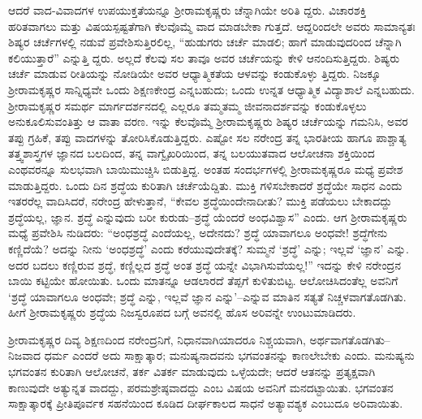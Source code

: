 ಆದರೆ ವಾದ-ವಿವಾದಗಳ ಉಪಯುಕ್ತತೆಯನ್ನೂ ಶ್ರೀರಾಮಕೃಷ್ಣರು ಚೆನ್ನಾಗಿಯೇ ಅರಿತಿ ದ್ದರು. ವಿಚಾರಶಕ್ತಿ ಹರಿತವಾಗಲು ಮತ್ತು ವಿಷಯಸ್ಪಷ್ಟತೆಗಾಗಿ ಕೆಲವೊಮ್ಮೆ ವಾದ ಮಾಡಬೇಕಾ ಗುತ್ತದೆ. ಆದ್ದರಿಂದಲೇ ಅವರು ಸಾಮಾನ್ಯತಃ ಶಿಷ್ಯರ ಚರ್ಚೆಗಳಲ್ಲಿ ನಡುವೆ ಪ್ರವೇಶಿಸುತ್ತಿರಲಿಲ್ಲ, “ಹುಡುಗರು ಚರ್ಚೆ ಮಾಡಲಿ; ಹಾಗೆ ಮಾಡುವುದರಿಂದ ಚೆನ್ನಾಗಿ ಕಲಿಯುತ್ತಾರೆ” ಎನ್ನುತ್ತಿ ದ್ದರು. ಅಲ್ಲದೆ ಕೆಲವು ಸಲ ತಾವೂ ಅವರ ಚರ್ಚೆಯನ್ನು ಕೇಳಿ ಆನಂದಿಸುತ್ತಿದ್ದರು. ಶಿಷ್ಯರು ಚರ್ಚೆ ಮಾಡುವ ರೀತಿಯನ್ನು ನೋಡಿಯೇ ಅವರ ಆಧ್ಯಾತ್ಮಿಕತೆಯ ಆಳವನ್ನು ಕಂಡುಕೊಳ್ಳು ತ್ತಿದ್ದರು. ನಿಜಕ್ಕೂ ಶ್ರೀರಾಮಕೃಷ್ಣರ ಸಾನ್ನಿಧ್ಯವೇ ಒಂದು ಶಿಕ್ಷಣಕೇಂದ್ರ ಎನ್ನಬಹುದು; ಒಂದು ಉನ್ನತ ಆಧ್ಯಾತ್ಮಿಕ ವಿದ್ಯಾಶಾಲೆ ಎನ್ನಬಹುದು. ಶ್ರೀರಾಮಕೃಷ್ಣರ ಸಮರ್ಥ ಮಾರ್ಗದರ್ಶನದಲ್ಲಿ ಎಲ್ಲರೂ ತಮ್ಮತಮ್ಮ ಜೀವನಾದರ್ಶವನ್ನು ಕಂಡುಕೊಳ್ಳಲು ಅನುಕೂಲಿಸುವಂತಿತ್ತು ಆ ವಾತಾ ವರಣ. ಇನ್ನು ಕೆಲವೊಮ್ಮೆ ಶ್ರೀರಾಮಕೃಷ್ಣರು ಶಿಷ್ಯರ ಚರ್ಚೆಯನ್ನು ಗಮನಿಸಿ, ಅವರ ತಪ್ಪು ಗ್ರಹಿಕೆ, ತಪ್ಪು ವಾದಗಳನ್ನು ತೋರಿಸಿಕೊಡುತ್ತಿದ್ದರು. ಎಷ್ಟೋ ಸಲ ನರೇಂದ್ರ ತನ್ನ ಭಾರತೀಯ ಹಾಗೂ ಪಾಶ್ಚಾತ್ಯ ತತ್ತ್ವಶಾಸ್ತ್ರಗಳ ಜ್ಞಾನದ ಬಲದಿಂದ, ತನ್ನ ವಾಗ್ವೈಖರಿಯಿಂದ, ತನ್ನ ಬಲಯುತವಾದ ಆಲೋಚನಾ ಶಕ್ತಿಯಿಂದ ಎಂಥವರನ್ನೂ ಸುಲಭವಾಗಿ ಬಾಯಿಮುಚ್ಚಿಸಿ ಬಿಡುತ್ತಿದ್ದ. ಅಂತಹ ಸಂದರ್ಭಗಳಲ್ಲಿ ಶ್ರೀರಾಮಕೃಷ್ಣರೂ ಮಧ್ಯೆ ಪ್ರವೇಶ ಮಾಡುತ್ತಿದ್ದರು. ಒಂದು ದಿನ ಶ್ರದ್ಧೆಯ ಕುರಿತಾಗಿ ಚರ್ಚೆಯೆದ್ದಿತು. ಮುಕ್ತಿ ಗಳಿಸಬೇಕಾದರೆ ಶ್ರದ್ಧೆಯೇ ಸಾಧನ ಎಂದು ಇತರರೆಲ್ಲ ವಾದಿಸಿದರೆ, ನರೇಂದ್ರ ಹೇಳುತ್ತಾನೆ, “ಕೇವಲ ಶ್ರದ್ಧೆಯಿಂದೇನಾದೀತು? ಮುಕ್ತಿ ಪಡೆಯಲು ಬೇಕಾದದ್ದು ಶ್ರದ್ಧೆಯಲ್ಲ, ಜ್ಞಾನ. ಶ್ರದ್ಧೆ ಎನ್ನುವುದು ಬರೀ ಕುರುಡು–ಶ್ರದ್ಧೆ ಯೆಂದರೆ ಅಂಧವಿಶ್ವಾಸ” ಎಂದು. ಆಗ ಶ್ರೀರಾಮಕೃಷ್ಣರು ಮಧ್ಯೆ ಪ್ರವೇಶಿಸಿ ನುಡಿದರು: “ಅಂಧಶ್ರದ್ಧೆ ಎಂದೆಯಲ್ಲ, ಅದೇನದು? ಶ್ರದ್ಧೆ ಯಾವಾಗಲೂ ಅಂಧವೇ! ಶ್ರದ್ಧೆಗೇನು ಕಣ್ಣಿದೆಯೆ? ಅದನ್ನು ನೀನು ‘ಅಂಧಶ್ರದ್ಧೆ’ ಎಂದು ಕರೆಯುವುದೇತಕ್ಕೆ? ಸುಮ್ಮನೆ ‘ಶ್ರದ್ಧೆ’ ಎನ್ನು; ಇಲ್ಲವೆ ‘ಜ್ಞಾನ’ ಎನ್ನು. ಅದರ ಬದಲು ಕಣ್ಣಿರುವ ಶ್ರದ್ಧೆ, ಕಣ್ಣಿಲ್ಲದ ಶ್ರದ್ಧೆ ಅಂತ ಶ್ರದ್ಧೆ ಯನ್ನೇ ವಿಭಾಗಿಸುವೆಯಲ್ಲ!” ಇದನ್ನು ಕೇಳಿ ನರೇಂದ್ರನ ಬಾಯಿ ಕಟ್ಟಿಯೇ ಹೋಯಿತು. ಒಂದು ಮಾತನ್ನೂ ಆಡಲಾರದೆ ತೆಪ್ಪಗೆ ಕುಳಿತುಬಿಟ್ಟ. ಆಲೋಚಿಸಿದಂತೆಲ್ಲ ಅವನಿಗೆ ‘ಶ್ರದ್ಧೆ ಯಾವಾಗಲೂ ಅಂಧವೇ; ಶ್ರದ್ಧೆ ಎನ್ನು, ಇಲ್ಲವೆ ಜ್ಞಾನ ಎನ್ನು’–ಎನ್ನುವ ಮಾತಿನ ಸತ್ಯತೆ ನಿಚ್ಚಳವಾಗತೊಡಗಿತು. ಹೀಗೆ ಶ್ರೀರಾಮಕೃಷ್ಣರು ಶ್ರದ್ಧೆಯ ನಿಜಸ್ವರೂಪದ ಬಗ್ಗೆ ಅವನಲ್ಲಿ ಹೊಸ ಅರಿವನ್ನೇ ಉಂಟುಮಾಡಿದರು.

ಶ್ರೀರಾಮಕೃಷ್ಣರ ದಿವ್ಯ ಶಿಕ್ಷಣದಿಂದ ನರೇಂದ್ರನಿಗೆ, ನಿಧಾನವಾಗಿಯಾದರೂ ನಿಶ್ಚಯವಾಗಿ, ಅರ್ಥವಾಗತೊಡಗಿತು–ನಿಜವಾದ ಧರ್ಮ ಎಂದರೆ ಅದು ಸಾಕ್ಷಾತ್ಕಾರ; ಮನುಷ್ಯನಾದವನು ಭಗವಂತನನ್ನು ಕಾಣಲೇಬೇಕು ಎಂದು. ಮನುಷ್ಯನು ಭಗವಂತನ ಕುರಿತಾಗಿ ಆಲೋಚನೆ, ತರ್ಕ ವಿತರ್ಕ ಮಾಡುವುದು ಒಳ್ಳೆಯದೇ; ಆದರೆ ಆತನನ್ನು ಪ್ರತ್ಯಕ್ಷವಾಗಿ ಕಾಣುವುದೇ ಅತ್ಯುನ್ನತ ವಾದದ್ದು, ಪರಮಶ್ರೇಷ್ಠವಾದದ್ದು ಎಂಬ ವಿಷಯ ಅವನಿಗೆ ಮನದಟ್ಟಾಯಿತು. ಭಗವಂತನ ಸಾಕ್ಷಾತ್ಕಾರಕ್ಕೆ ಪ್ರೀತಿಪೂರ್ವಕ ಸಹನೆಯಿಂದ ಕೂಡಿದ ದೀರ್ಘಕಾಲದ ಸಾಧನೆ ಅತ್ಯಾವಶ್ಯಕ ಎಂಬುದೂ ಅರಿವಾಯಿತು.

